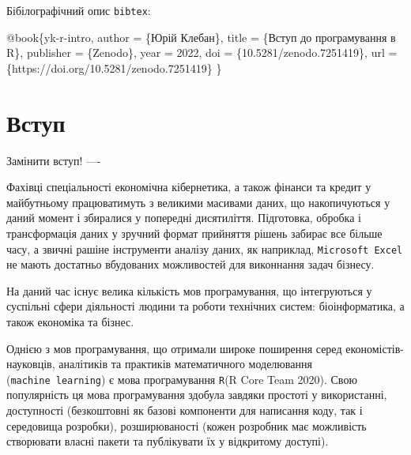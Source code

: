 \documentclass[
  letterpaper,
  DIV=11,
  numbers=noendperiod]{scrreprt}
\newenvironment{Shaded}{\begin{snugshade}}{\end{snugshade}}
\newcommand{\DataTypeTok}[1]{\textcolor[rgb]{0.68,0.00,0.00}{#1}}
\newcommand{\NormalTok}[1]{\textcolor[rgb]{0.00,0.23,0.31}{#1}}
\newcommand{\OtherTok}[1]{\textcolor[rgb]{0.00,0.23,0.31}{#1}}
\newcommand{\VariableTok}[1]{\textcolor[rgb]{0.07,0.07,0.07}{#1}}
\begin{document}
Бібілографічний опис \texttt{bibtex}:

\begin{Shaded}
\begin{Highlighting}[]
\VariableTok{@book}\NormalTok{\{}\OtherTok{yk}\NormalTok{{-}}\OtherTok{r}\NormalTok{{-}}\OtherTok{intro}\NormalTok{,}
  \DataTypeTok{author}\NormalTok{       = \{Юрій Клебан\},}
  \DataTypeTok{title}\NormalTok{        = \{Вступ до програмування в R\},}
  \DataTypeTok{publisher}\NormalTok{    = \{Zenodo\},}
  \DataTypeTok{year}\NormalTok{         = 2022,}
  \DataTypeTok{doi}\NormalTok{          = \{10.5281/zenodo.7251419\},}
  \DataTypeTok{url}\NormalTok{          = \{https://doi.org/10.5281/zenodo.7251419\}}
\NormalTok{\}}
\end{Highlighting}
\end{Shaded}


\chapter*{Вступ}\label{ux432ux441ux442ux443ux43f}


Замінити вступ! ----

Фахівці спеціальності економічна кібернетика, а також фінанси та кредит
у майбутньому працюватимуть з великими масивами даних, що накопичуються
у даний момент і збиралися у попередні дисятиліття. Підготовка, обробка
і трансформація даних у зручний формат прийняття рішень забирає все
більше часу, а звичні рашіне інструменти аналізу даних, як наприклад,
\texttt{Microsoft\ Excel} не мають достатньо вбудованих можливостей для
виконнання задач бізнесу.

На даний час існує велика кількість мов програмування, що інтегруються у
суспільні сфери діяльності людини та роботи технічних систем:
біоінформатика, а також економіка та бізнес.

Однією з мов програмування, що отримали широке поширення серед
економістів-науковців, аналітиків та практиків математичного моделювання
(\texttt{machine\ learning}) є мова програмування \texttt{R}(R Core Team
2020). Свою популярність ця мова програмування здобула завдяки простоті
у використанні, доступності (безкоштовні як базові компоненти для
написання коду, так і середовища розробки), розширюваності (кожен
розробник має можливість створювати власні пакети та публікувати їх у
відкритому доступі).
\end{document}
